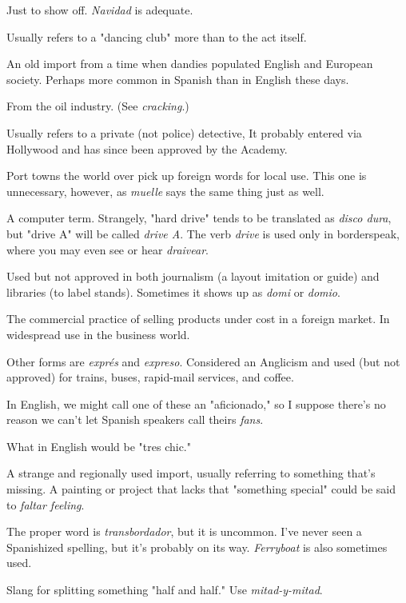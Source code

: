  Just to show off. \emph{Navidad} is adequate.

 Usually refers to a "dancing club" more than to
the act itself.

 An old import from a time when dandies populated
English and European society. Perhaps more common in Spanish than
in English these days.

 From the oil industry. (See \emph{cracking}.)

 Usually refers to a private (not police) detective,
It probably entered via Hollywood and has since been approved by the
Academy.

 Port towns the world over pick up foreign words for local use. This one is unnecessary, however, as \emph{muelle} says the same
thing just as well.

 A computer term. Strangely, "hard drive" tends to be
translated as \emph{disco dura}, but "drive A" will be called \emph{drive A}. The
verb \emph{drive} is used only in borderspeak, where you may even see or hear
\emph{draivear}.

 Used but not approved in both journalism (a layout
imitation or guide) and libraries (to label stands). Sometimes it shows
up as \emph{domi} or \emph{domio}.

 The commercial practice of selling products under
cost in a foreign market. In widespread use in the business world.

 Other forms are \emph{exprés} and \emph{expreso}. Considered an
Anglicism and used (but not approved) for trains, buses, rapid-mail services, and coffee.

 In English, we might call one of these an "aficionado,"
so I suppose there's no reason we can't let Spanish speakers call
theirs \emph{fans}.

 What in English would be "tres chic."

 A strange and regionally used import, usually referring to something that's missing. A painting or project that lacks that
"something special" could be said to \emph{faltar feeling}.

 The proper word is \emph{transbordador}, but it is uncommon. I've never seen a Spanishized spelling, but it's probably on its
way. \emph{Ferryboat} is also sometimes used.

 Slang for splitting something "half and half."
Use \emph{mitad-y-mitad}.


